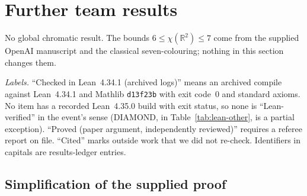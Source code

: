 \documentclass[11pt]{article}
\theoremstyle{definition}
\theoremstyle{remark}
\begin{document}
\section{Further team results}

No global chromatic result.
The bounds $6\le\chi(\mathbb{R}^2)\le 7$ come from the supplied OpenAI
manuscript and the classical seven-colouring; nothing in this section changes
them.

\emph{Labels.} ``Checked in Lean~4.34.1 (archived logs)'' means an archived
compile against Lean~4.34.1 and Mathlib \texttt{d13f23b} with exit code~0 and
standard axioms. No item has a recorded Lean~4.35.0 build with exit status,
so none is ``Lean-verified'' in the event's sense (DIAMOND, in
Table~\ref{tab:lean-other}, is a partial exception). ``Proved (paper argument,
independently reviewed)'' requires a referee report on file. ``Cited'' marks
outside work that we did not re-check. Identifiers in capitals are
results-ledger entries.

\subsection{Simplification of the supplied proof}
\end{document}
